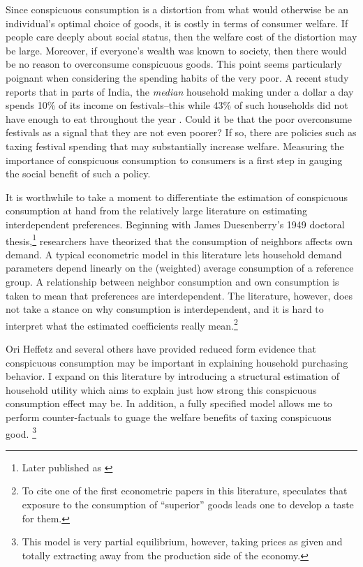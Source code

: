 \documentclass{article}
\begin{document}
Since conspicuous consumption is a distortion from what would otherwise be an individual's optimal choice of goods, it is costly in terms of consumer welfare.  If people care deeply about social status, then the welfare cost of the distortion may be large.  Moreover, if everyone's wealth was known to society, then there would be no reason to overconsume conspicuous goods.  This point seems particularly poignant when considering the spending habits of the very poor.  A recent study reports that in parts of India, the \emph{median} household making under a dollar a day spends 10\% of its income on festivals--this while 43\% of such households did not have enough to eat throughout the year \citep{BanerjeeDuflo2007}.  Could it be that the poor overconsume festivals as a signal that they are not even poorer?  If so, there are policies such as taxing festival spending that may substantially increase welfare.  Measuring the importance of conspicuous consumption to consumers is a first step in gauging the social benefit of such a policy.

It is worthwhile to take a moment to differentiate the estimation of conspicuous consumption at hand from the relatively large literature on estimating interdependent preferences.  Beginning with James Duesenberry's 1949 doctoral thesis,\footnote{Later published as \citep{Duesenberry1949}} researchers have theorized that the consumption of neighbors affects own demand.  A typical econometric model in this literature lets household demand parameters depend linearly on the (weighted) average consumption of a reference group. A relationship between neighbor consumption and own consumption is taken to mean that preferences are interdependent.  The literature, however, does not take a stance on why consumption is interdependent, and it is hard to interpret what the estimated coefficients really mean.\footnote{To cite one of the first econometric papers in this literature, \citet{Pollak1976} speculates that exposure to the consumption of ``superior'' goods leads one to develop a taste for them.}  

Ori Heffetz and several others have provided reduced form evidence that conspicuous consumption may be important in explaining household purchasing behavior.
I expand on this literature by introducing a structural estimation of household utility which aims to explain just how strong this conspicuous consumption effect may be.
In addition, a fully specified model allows me to perform counter-factuals to guage the welfare benefits of taxing conspicuous good.
\footnote{This model is very partial equilibrium, however, taking prices as given and totally extracting away from the production side of the economy.}
\end{document}
